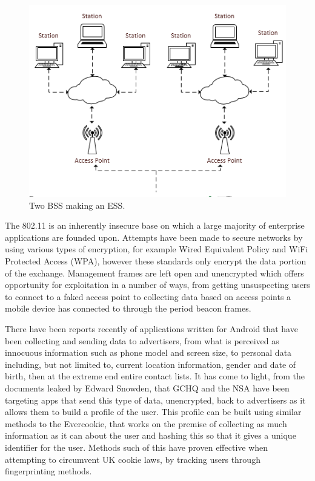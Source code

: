 \begin{figure}[htb!]
\centering\includegraphics{intro/diagrams/ess.png}
\caption{Two BSS making an ESS.}
\end{figure}
\pagebreak
The 802.11 is an inherently insecure base on which a large majority of enterprise applications are founded upon. Attempts have been made to secure networks by using various types of encryption, for example Wired Equivalent Policy and WiFi Protected Access (WPA), however these standards only encrypt the data portion of the exchange. Management frames are left open and unencrypted which offers opportunity for exploitation in a number of ways, from getting unsuspecting users to connect to a faked access point to collecting data based on access points a mobile device has connected to through the period beacon frames.
 
There have been reports recently \cite{intro:bbc_flashlight_app} of applications written for Android that have been collecting and sending data to advertisers, from what is perceived as innocuous information such as phone model and screen size, to personal data including, but not limited to, current location information, gender and date of birth, then at the extreme end entire contact lists. It has come to light, from the documents leaked by Edward Snowden, that GCHQ and the NSA have been targeting apps that send this type of data, unencrypted, back to advertisers as it allows them to build a profile of the user. This profile can be built using similar methods to the Evercookie, that works on the premise of collecting as much information as it can about the user and hashing this so that it gives a unique identifier for the user. Methods such of this have proven effective when attempting to circumvent UK cookie laws, by tracking users through fingerprinting methods.

